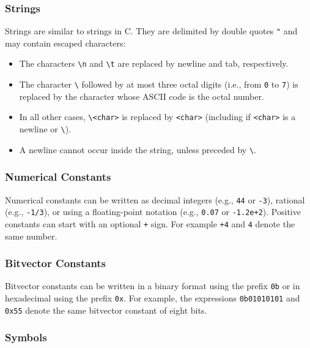 \documentclass[11pt,twoside,fleqn,openright,titlepage]{cslreport}
\begin{document}
\subsubsection*{Strings}

Strings  are similar to  strings in  C. They  are delimited  by double
quotes \texttt{"} and may contain escaped characters:
\begin{itemize}
\item     The     characters     \texttt{\textbackslash     n}     and
  \texttt{\textbackslash   t}  are  replaced   by  newline   and  tab,
  respectively.
\item The character \texttt{\textbackslash}  followed by at most three
  octal digits  (i.e., from \texttt{0}  to \texttt{7}) is  replaced by
  the character whose ASCII code is the octal number.
\item In  all other cases, \texttt{\textbackslash  <char>} is replaced
  by  \texttt{<char>} (including  if \texttt{<char>}  is a  newline or
  \texttt{\textbackslash}).
\item A  newline cannot  occur inside the  string, unless  preceded by
  \texttt{\textbackslash}.
\end{itemize}

\subsubsection*{Numerical Constants}

Numerical  constants  can  be   written  as  decimal  integers  (e.g.,
\texttt{44} or \texttt{-3}), rational (e.g., \texttt{-1/3}), or using a
floating-point  notation  (e.g.,  \texttt{0.07} or  \texttt{-1.2e+2}).
Positive  constants can start  with an  optional \texttt{+}  sign. For
example \texttt{+4} and \texttt{4} denote the same number.


\subsubsection*{Bitvector Constants}

Bitvector constants can be written in a binary format using the prefix
\texttt{0b}  or  in  hexadecimal  using the  prefix  \texttt{0x}.  For
example, the expressions  \texttt{0b01010101} and \texttt{0x55} denote
the same bitvector constant of eight bits.

\subsubsection*{Symbols}
\end{document}
